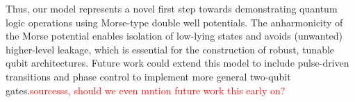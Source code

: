 \documentclass{subfiles}
\begin{document}
Thus, our model represents a novel first step towards demonstrating quantum logic operations using Morse-type double well potentials. The anharmonicity of the Morse potential enables isolation of low-lying states and avoids (unwanted) higher-level leakage, which is essential for the construction of robust, tunable qubit architectures. Future work could extend this model to include pulse-driven transitions and phase control to implement more general two-qubit gates.\textcolor{red}{sourcesss, should we even mntion future work this early on?} \\ \\
\end{document}
